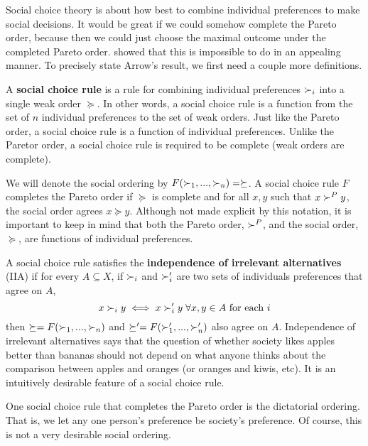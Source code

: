 Social choice theory is about how best to combine individual
preferences to make social decisions.  It would be great if we could
somehow complete the Pareto order, because then we could just choose
the maximal outcome under the completed Pareto order.
\cite{arrow1950} showed that this is impossible to do in an appealing
manner. To precisely state Arrow's result, we first need a couple more
definitions. 

A \textbf{social choice rule} is a rule for combining individual
preferences $\succ_i$ into a single weak order $\succeq$. In other
words, a social choice rule is a function from
the set of $n$ individual preferences to the
set of weak orders. Just like the Pareto order, a social choice rule
is a function of individual preferences. Unlike the Paretor order, a
social choice rule is required to be complete (weak orders are
complete).

We will denote the social ordering by
$F(\succ_1, ..., \succ_n) = \succeq$. A social choice rule $F$
completes the Pareto order if $\succeq$ is complete and for all $x,y$
such that $x \succ^P y$, the social order agrees $x \succeq
y$. Although not made explicit by this notation, it is important to
keep in mind that both the Pareto order, $\succ^P$, and the social
order, $\succeq$, are functions of individual preferences.

A social choice rule satisfies the \textbf{independence of irrelevant
  alternatives} (IIA) if for every $A \subseteq X$, if $\succ_i$ and
$\succ_i'$ are two sets of individuals preferences that agree on $A$,
\[ x \succ_i y \iff x \succ_i' y \; \forall x,y \in A \text{ for each
} i\] 
then $\succeq=F(\succ_1, ..., \succ_n)$ and $\succeq'=F(\succ_1', ...,
\succ_n')$ also agree on $A$. Independence 
of irrelevant alternatives says that the question of whether society
likes apples better than bananas should not depend on what anyone
thinks about the comparison between apples and oranges (or oranges and
kiwis, etc). It is an intuitively desirable feature of a social
choice rule.

One social choice rule that completes the Pareto order is the
dictatorial ordering. That is, we let any one person's preference be
society's preference. Of course, this is not a very desirable social
ordering.

